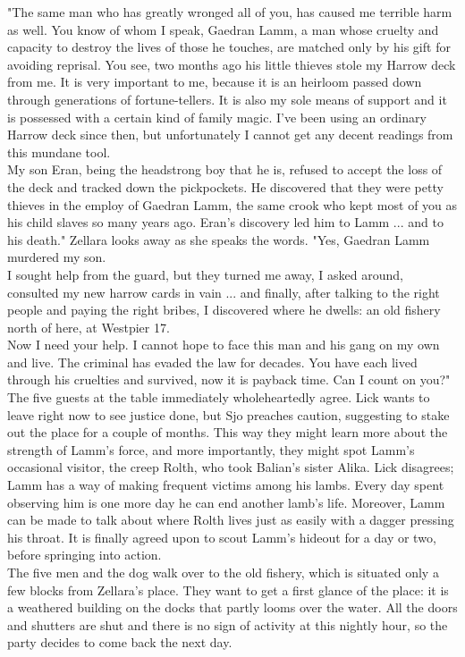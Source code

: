 "The same man who has greatly wronged all of you, has caused me terrible harm as well. You know of whom I speak, Gaedran Lamm, a man whose cruelty and capacity to destroy the lives of those he touches, are matched only by his gift for avoiding reprisal. You see, two months ago his little thieves stole my Harrow deck from me. It is very important to me, because it is an heirloom passed down through generations of fortune-tellers. It is also my sole means of support and it is possessed with a certain kind of family magic. I've been using an ordinary Harrow deck since then, but unfortunately I cannot get any decent readings from this mundane tool.\\

My son Eran, being the headstrong boy that he is, refused to accept the loss of the deck and tracked down the pickpockets. He discovered that they were petty thieves in the employ of Gaedran Lamm, the same crook who kept most of you as his child slaves so many years ago. Eran's discovery led him to Lamm ... and to his death." Zellara looks away as she speaks the words. "Yes, Gaedran Lamm murdered my son.\\

I sought help from the guard, but they turned me away, I asked around, consulted my new harrow cards in vain ... and finally, after talking to the right people and paying the right bribes, I discovered where he dwells: an old fishery north of here, at Westpier 17.\\

Now I need your help. I cannot hope to face this man and his gang on my own and live. The criminal has evaded the law for decades. You have each lived through his cruelties and survived, now it is payback time. Can I count on you?"\\

The five guests at the table immediately wholeheartedly agree. Lick wants to leave right now to see justice done, but Sjo preaches caution, suggesting to stake out the place for a couple of months. This way they might learn more about the strength of Lamm's force, and more importantly, they might spot Lamm's occasional visitor, the creep Rolth, who took Balian's sister Alika. Lick disagrees; Lamm has a way of making frequent victims among his lambs. Every day spent observing him is one more day he can end another lamb's life. Moreover, Lamm can be made to talk about where Rolth lives just as easily with a dagger pressing his throat. It is finally agreed upon to scout Lamm's hideout for a day or two, before springing into action.\\

The five men and the dog walk over to the old fishery, which is situated only a few blocks from Zellara's place. They want to get a first glance of the place: it is a weathered building on the docks that partly looms over the water. All the doors and shutters are shut and there is no sign of activity at this nightly hour, so the party decides to come back the next day.\\

